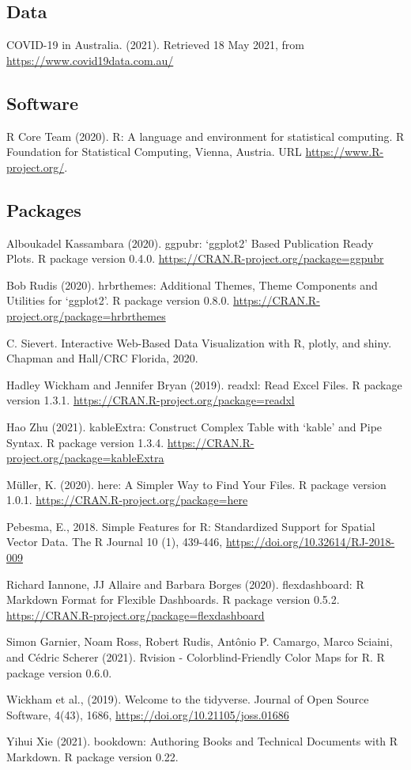 \documentclass[11pt,a4paper,]{article}
\begin{document}
\hypertarget{data}{%
\subsection{Data}\label{data}}

COVID-19 in Australia. (2021). Retrieved 18 May 2021, from \url{https://www.covid19data.com.au/}

\hypertarget{software}{%
\subsection{Software}\label{software}}

R Core Team (2020). R: A language and environment for statistical computing. R Foundation for Statistical Computing, Vienna, Austria. URL \url{https://www.R-project.org/}.

\hypertarget{packages}{%
\subsection{Packages}\label{packages}}

Alboukadel Kassambara (2020). ggpubr: `ggplot2' Based Publication Ready Plots. R package version 0.4.0. \url{https://CRAN.R-project.org/package=ggpubr}

Bob Rudis (2020). hrbrthemes: Additional Themes, Theme Components and Utilities for `ggplot2'. R package version 0.8.0. \url{https://CRAN.R-project.org/package=hrbrthemes}

C. Sievert. Interactive Web-Based Data Visualization with R, plotly, and shiny. Chapman and Hall/CRC Florida, 2020.

Hadley Wickham and Jennifer Bryan (2019). readxl: Read Excel Files. R package version 1.3.1. \url{https://CRAN.R-project.org/package=readxl}

Hao Zhu (2021). kableExtra: Construct Complex Table with `kable' and Pipe Syntax. R package version 1.3.4. \url{https://CRAN.R-project.org/package=kableExtra}

Müller, K. (2020). here: A Simpler Way to Find Your Files. R package version 1.0.1. \url{https://CRAN.R-project.org/package=here}

Pebesma, E., 2018. Simple Features for R: Standardized Support for Spatial Vector Data. The R Journal 10 (1), 439-446, \url{https://doi.org/10.32614/RJ-2018-009}

Richard Iannone, JJ Allaire and Barbara Borges (2020). flexdashboard: R Markdown Format for Flexible Dashboards. R package version 0.5.2. \url{https://CRAN.R-project.org/package=flexdashboard}

Simon Garnier, Noam Ross, Robert Rudis, Antônio P. Camargo, Marco Sciaini, and Cédric Scherer (2021). Rvision - Colorblind-Friendly Color Maps for R. R package version 0.6.0.

Wickham et al., (2019). Welcome to the tidyverse. Journal of Open Source Software, 4(43), 1686, \url{https://doi.org/10.21105/joss.01686}

Yihui Xie (2021). bookdown: Authoring Books and Technical Documents with R Markdown. R package version 0.22.

\printbibliography
\end{document}
